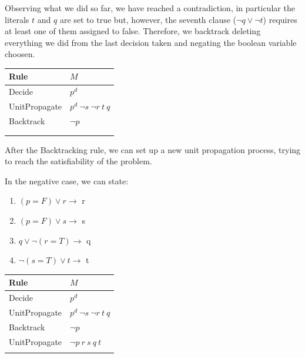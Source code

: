 \begin{example}
    Observing what we did so far, we have reached a contradiction, in particular the literals $t$ and $q$ are set to true but, however, the seventh clause 
    ($\neg q \vee \neg t$) requires at least one of them assigned to false. Therefore, we backtrack deleting everything we did from the last decision taken and negating 
    the boolean variable choosen. \vspace{7pt}
    \begin{center}
        \begin{tabular}{|p{2.75cm}|p{5cm}|} 
            \hline
                \textbf{Rule} & $M$\\ 
            \hline
                Decide & $p^d$ \\
            \hline
                UnitPropagate & $p^d\  \neg s \ \neg r \ t \ q$ \\
            \hline
                Backtrack & $\neg p$ \\
            \hline
                & \\
            \hline
                & \\
            \hline
        \end{tabular}
    \end{center} \vspace{7pt}

    After the Backtracking rule, we can set up a new unit propagation process, trying to reach the satisfiability of the problem. \vspace{7pt}

    In the negative case, we can state:
    \begin{enumerate}
        \item[2.] $(p = F) \vee r \rightarrow$ r
        \item[5.] $(p = F) \vee s \rightarrow$ s
        \item[9.] $q \vee \neg (r = T) \rightarrow$ q 
        \item[3.] $\neg (s = T) \vee t \rightarrow$ t
    \end{enumerate} \vspace{7pt}
    \begin{center}
        \begin{tabular}{|p{2.75cm}|p{5cm}|}          
            \hline
                \textbf{Rule} & $M$\\ 
            \hline
                Decide & $p^d$ \\
            \hline
                UnitPropagate & $p^d\  \neg s \ \neg r \ t \ q$ \\
            \hline
                Backtrack & $\neg p$ \\
            \hline
                UnitPropagate & $\neg p \ r \ s \ q \ t $ \\
            \hline
                & \\
            \hline
        \end{tabular}
    \end{center} \vspace{7pt}


\end{example}
